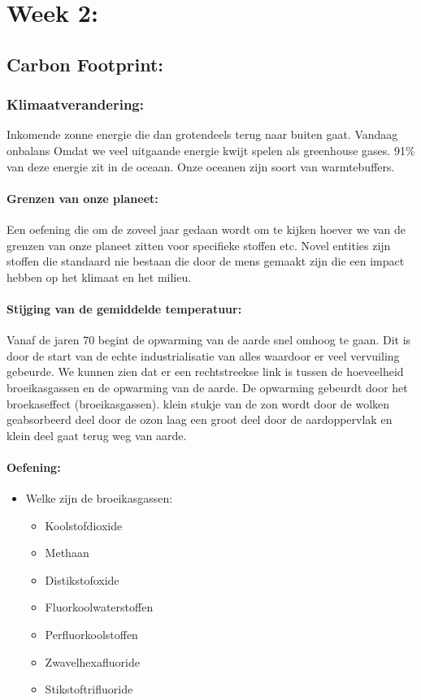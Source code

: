 \documentclass[12pt]{article}
\begin{document}
\section{Week 2:}
\subsection{Carbon Footprint:}
\subsubsection{Klimaatverandering:}
Inkomende zonne energie die dan grotendeels terug naar buiten gaat.
Vandaag onbalans Omdat we veel uitgaande energie kwijt spelen als greenhouse gases. 91\% van deze energie zit in de oceaan. Onze oceanen zijn soort van warmtebuffers. 
\paragraph{Grenzen van onze planeet:}
Een oefening die om de zoveel jaar gedaan wordt om te kijken hoever we van de grenzen van onze planeet zitten voor specifieke stoffen etc. Novel entities zijn stoffen die standaard nie bestaan die door de mens gemaakt zijn die een impact hebben op het klimaat en het milieu.
\paragraph{Stijging van de gemiddelde temperatuur:}
Vanaf de jaren 70 begint de opwarming van de aarde snel omhoog te gaan. Dit is door de start van de echte industrialisatie van alles waardoor er veel vervuiling gebeurde. We kunnen zien dat er een rechtstreekse link is tussen de hoeveelheid broeikasgassen en de opwarming van de aarde. De opwarming gebeurdt door het broekaseffect (broeikasgassen). klein stukje van de zon wordt door de wolken geabsorbeerd deel door de ozon laag een groot deel door de aardoppervlak en klein deel gaat terug weg van aarde.
\paragraph{Oefening:}
\begin{itemize}
    \item Welke zijn de broeikasgassen:\begin{itemize}
        \item Koolstofdioxide
        \item Methaan
        \item Distikstofoxide
        \item Fluorkoolwaterstoffen
        \item Perfluorkoolstoffen
        \item Zwavelhexafluoride
        \item Stikstoftrifluoride
    \end{itemize}
\end{itemize}
\end{document}
